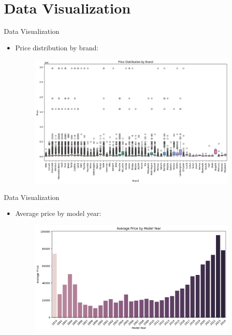 \documentclass{beamer}
\begin{document}
\section{Data Visualization}
\begin{frame}{Data Visualization}
    \begin{itemize}
        \item Price distribution by brand:
            \begin{figure}
                \centering
                \includegraphics[width=1\linewidth]{images/boxplot_price_distribution_by_brand.png}
            \end{figure}
    \end{itemize}
\end{frame}

\begin{frame}{Data Visualization}
    \begin{itemize}
        \item Average price by model year:
            \begin{figure}
                \centering
                \includegraphics[width=1\linewidth]{images/avg_price_by_model_year.png}
            \end{figure}
    \end{itemize}
\end{frame}
\end{document}
